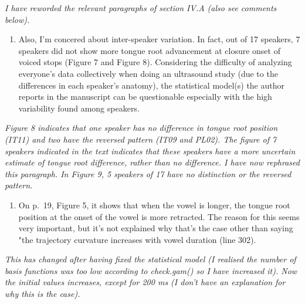 \documentclass[]{article}
\providecommand{\tightlist}{%
  \setlength{\itemsep}{0pt}\setlength{\parskip}{0pt}}
\begin{document}
\begin{adjustwidth}{1cm}{} \textit{
I have reworded the relevant paragraphs of section IV.A (also see comments below).
} \end{adjustwidth}

\begin{enumerate}
\def\labelenumi{\arabic{enumi}.}
\setcounter{enumi}{1}
\tightlist
\item
  Also, I'm concered about inter-speaker variation. In fact, out of 17
  speakers, 7 speakers did not show more tongue root advancement at
  closure onset of voiced stops (Figure 7 and Figure 8). Considering the
  difficulty of analyzing everyone's data collectively when doing an
  ultrasound study (due to the differences in each speaker's anatomy),
  the statistical model(s) the author reports in the manuscript can be
  questionable especially with the high variability found among
  speakers.
\end{enumerate}

\begin{adjustwidth}{1cm}{} \textit{
Figure 8 indicates that one speaker has no difference in tongue root position (IT11) and two have the reversed pattern (IT09 and PL02). The figure of 7 speakers indicated in the text indicates that these speakers have a more uncertain estimate of tongue root difference, rather than no difference. I have now rephrased this paragraph. In Figure 9, 5 speakers of 17 have no distinction or the reversed pattern.
} \end{adjustwidth}

\begin{enumerate}
\def\labelenumi{\arabic{enumi}.}
\setcounter{enumi}{2}
\tightlist
\item
  On p.~19, Figure 5, it shows that when the vowel is longer, the tongue
  root position at the onset of the vowel is more retracted. The reason
  for this seems very important, but it's not explained why that's the
  case other than saying "the trajectory curvature increases with vowel
  duration (line 302).
\end{enumerate}

\begin{adjustwidth}{1cm}{} \textit{
This has changed after having fixed the statistical model (I realised the number of basis functions was too low according to check.gam() so I have increased it). Now the initial values increases, except for 200 ms (I don't have an explanation for why this is the case).
} \end{adjustwidth}
\end{document}
